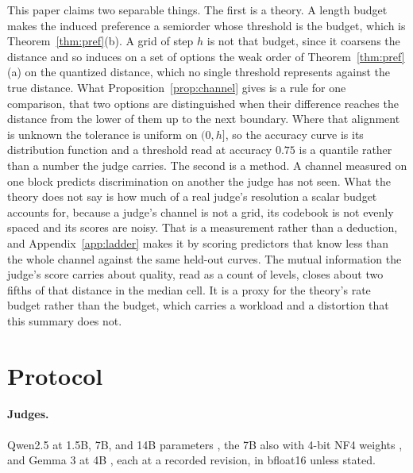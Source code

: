 \documentclass{article}
\theoremstyle{definition}
\theoremstyle{remark}
\begin{document}
This paper claims two separable things.
The first is a theory. A length budget makes the induced preference a semiorder whose threshold is the budget, which is Theorem~\ref{thm:pref}(b). A grid of step $h$ is not that budget, since it coarsens the distance and so induces on a set of options the weak order of Theorem~\ref{thm:pref}(a) on the quantized distance, which no single threshold represents against the true distance. What Proposition~\ref{prop:channel} gives is a rule for one comparison, that two options are distinguished when their difference reaches the distance from the lower of them up to the next boundary. Where that alignment is unknown the tolerance is uniform on $(0,h]$, so the accuracy curve is its distribution function and a threshold read at accuracy $0.75$ is a quantile rather than a number the judge carries.
The second is a method. A channel measured on one block predicts discrimination on another the judge has not seen.
What the theory does not say is how much of a real judge's resolution a scalar budget accounts for, because a judge's channel is not a grid, its codebook is not evenly spaced and its scores are noisy.
That is a measurement rather than a deduction, and Appendix~\ref{app:ladder} makes it by scoring predictors that know less than the whole channel against the same held-out curves.
The mutual information the judge's score carries about quality, read as a count of levels, closes about two fifths of that distance in the median cell. It is a proxy for the theory's rate budget rather than the budget, which carries a workload and a distortion that this summary does not.

\section{Protocol}
\label{sec:protocol}

\paragraph{Judges.}
Qwen2.5 at 1.5B, 7B, and 14B parameters \citep{qwen2025}, the 7B also with 4-bit NF4 weights \citep{dettmers2023}, and Gemma 3 at 4B \citep{gemma3}, each at a recorded revision, in bfloat16 unless stated.
\end{document}
